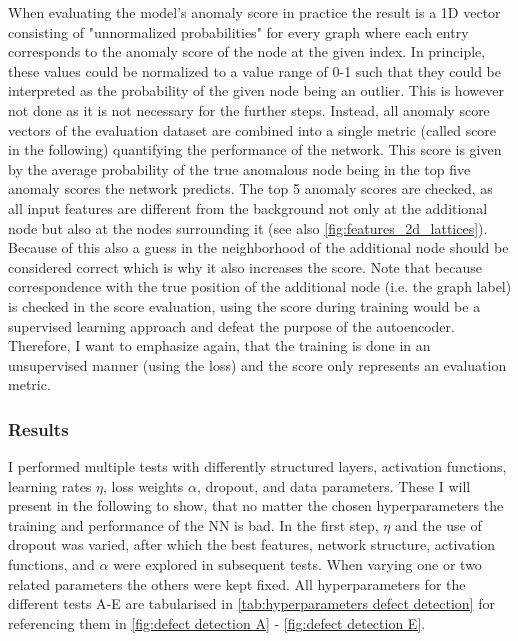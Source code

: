 \documentclass[11pt,a4paper]{article}
\begin{document}
When evaluating the model's anomaly score in practice the result is a 1D vector consisting of "unnormalized probabilities" for every graph where each entry corresponds to the anomaly score of the node at the given index. 
In principle, these values could be normalized to a value range of 0-1 such that they could be interpreted as the probability of the given node being an outlier. 
This is however not done as it is not necessary for the further steps. 
Instead, all anomaly score vectors of the evaluation dataset are combined into a single metric (called score in the following) quantifying the performance of the network. 
This score is given by the average probability of the true anomalous node being in the top five anomaly scores the network predicts. 
The top 5 anomaly scores are checked, as all input features are different from the background not only at the additional node but also at the nodes surrounding it (see also \autoref{fig:features_2d_lattices}). 
Because of this also a guess in the neighborhood of the additional node should be considered correct which is why it also increases the score. 
Note that because correspondence with the true position of the additional node (i.e. the graph label) is checked in the score evaluation, using the score during training would be a supervised learning approach and defeat the purpose of the autoencoder. 
Therefore, I want to emphasize again, that the training is done in an unsupervised manner (using the loss) and the score only represents an evaluation metric. 


\subsubsection{Results}
I performed multiple tests with differently structured layers, activation functions, learning rates $\eta$, loss weights $\alpha$, dropout, and data parameters. 
These I will present in the following to show, that no matter the chosen hyperparameters the training and performance of the NN is bad. 
In the first step, $\eta$ and the use of dropout was varied, after which the best features, network structure, activation functions, and $\alpha$ were explored in subsequent tests. 
When varying one or two related parameters the others were kept fixed. 
All hyperparameters for the different tests A-E are tabularised in \autoref{tab:hyperparameters defect detection} for referencing them in \autoref{fig:defect detection A} - \autoref{fig:defect detection E}. 
\end{document}
